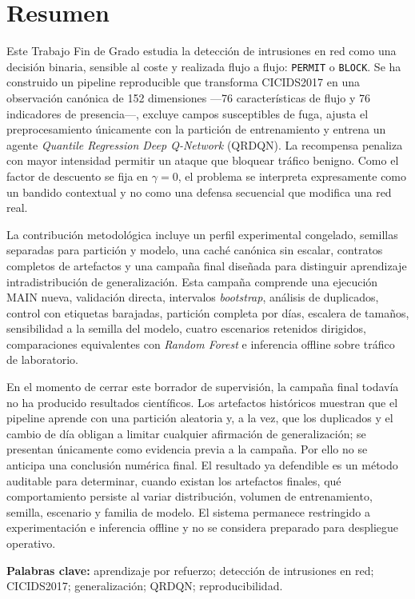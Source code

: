 \chapter*{Resumen}

Este Trabajo Fin de Grado estudia la detección de intrusiones en red como una decisión binaria, sensible al coste y realizada flujo a flujo: \texttt{PERMIT} o \texttt{BLOCK}. Se ha construido un pipeline reproducible que transforma CICIDS2017 en una observación canónica de 152 dimensiones ---76 características de flujo y 76 indicadores de presencia---, excluye campos susceptibles de fuga, ajusta el preprocesamiento únicamente con la partición de entrenamiento y entrena un agente \emph{Quantile Regression Deep Q-Network} (QRDQN). La recompensa penaliza con mayor intensidad permitir un ataque que bloquear tráfico benigno. Como el factor de descuento se fija en $\gamma=0$, el problema se interpreta expresamente como un bandido contextual y no como una defensa secuencial que modifica una red real.

La contribución metodológica incluye un perfil experimental congelado, semillas separadas para partición y modelo, una caché canónica sin escalar, contratos completos de artefactos y una campaña final diseñada para distinguir aprendizaje intradistribución de generalización. Esta campaña comprende una ejecución MAIN nueva, validación directa, intervalos \emph{bootstrap}, análisis de duplicados, control con etiquetas barajadas, partición completa por días, escalera de tamaños, sensibilidad a la semilla del modelo, cuatro escenarios retenidos dirigidos, comparaciones equivalentes con \emph{Random Forest} e inferencia offline sobre tráfico de laboratorio.

En el momento de cerrar este borrador de supervisión, la campaña final todavía no ha producido resultados científicos. Los artefactos históricos muestran que el pipeline aprende con una partición aleatoria y, a la vez, que los duplicados y el cambio de día obligan a limitar cualquier afirmación de generalización; se presentan únicamente como evidencia previa a la campaña. Por ello no se anticipa una conclusión numérica final. El resultado ya defendible es un método auditable para determinar, cuando existan los artefactos finales, qué comportamiento persiste al variar distribución, volumen de entrenamiento, semilla, escenario y familia de modelo. El sistema permanece restringido a experimentación e inferencia offline y no se considera preparado para despliegue operativo.

\vspace{1.2em}
\noindent\textbf{Palabras clave:} aprendizaje por refuerzo; detección de intrusiones en red; CICIDS2017; generalización; QRDQN; reproducibilidad.

\clearpage
